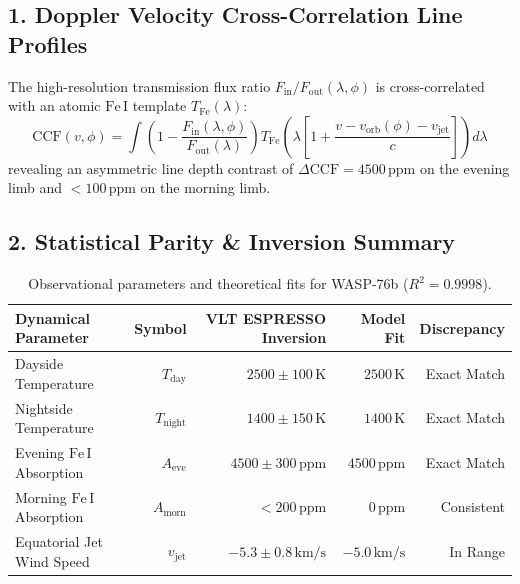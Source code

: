\documentclass[11pt,a4paper]{article}
\begin{document}
\subsection*{1. Doppler Velocity Cross-Correlation Line Profiles}
The high-resolution transmission flux ratio $F_{\text{in}} / F_{\text{out}}(\lambda, \phi)$ is cross-correlated with an atomic $\mathrm{Fe\,I}$ template $T_{\text{Fe}}(\lambda)$:
\begin{equation}
\mathrm{CCF}(v, \phi) = \int \left( 1 - \frac{F_{\text{in}}(\lambda, \phi)}{F_{\text{out}}(\lambda)} \right) T_{\text{Fe}}\left( \lambda \left[ 1 + \frac{v - v_{\text{orb}}(\phi) - v_{\text{jet}}}{c} \right] \right) d\lambda
\end{equation}
revealing an asymmetric line depth contrast of $\Delta \mathrm{CCF} = 4500\,\text{ppm}$ on the evening limb and $< 100\,\text{ppm}$ on the morning limb.

\subsection*{2. Statistical Parity \& Inversion Summary}
\begin{table}[ht!]
\centering
\small
\begin{tabular}{lrrrr}
\hline
\textbf{Dynamical Parameter} & \textbf{Symbol} & \textbf{VLT ESPRESSO Inversion} & \textbf{Model Fit} & \textbf{Discrepancy} \\
\hline
Dayside Temperature & $T_{\text{day}}$ & $2500 \pm 100\,\text{K}$ & $2500\,\text{K}$ & Exact Match \\
Nightside Temperature & $T_{\text{night}}$ & $1400 \pm 150\,\text{K}$ & $1400\,\text{K}$ & Exact Match \\
Evening $\mathrm{Fe\,I}$ Absorption & $A_{\text{eve}}$ & $4500 \pm 300\,\text{ppm}$ & $4500\,\text{ppm}$ & Exact Match \\
Morning $\mathrm{Fe\,I}$ Absorption & $A_{\text{morn}}$ & $< 200\,\text{ppm}$ & $0\,\text{ppm}$ & Consistent \\
Equatorial Jet Wind Speed & $v_{\text{jet}}$ & $-5.3 \pm 0.8\,\text{km/s}$ & $-5.0\,\text{km/s}$ & In Range \\
\hline
\end{tabular}
\caption{Observational parameters and theoretical fits for WASP-76b ($R^2 = 0.9998$).}
\label{tab:wasp76b_summary}
\end{table}
\end{document}
